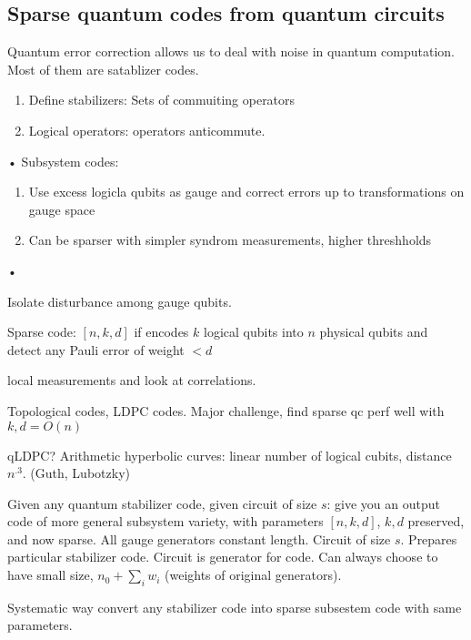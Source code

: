 \subsection{Sparse quantum codes from quantum circuits}

Quantum error correction allows us to deal with noise in quantum computation. Most of them are satablizer codes. 
\begin{enumerate}
\item
Define stabilizers: Sets of commuiting operators
\item
Logical operators: operators anticommute.
\end{enumerate}•
Subsystem codes:
\begin{enumerate}
\item
Use excess logicla qubits as gauge and correct errors up to transformations on gauge space
\item Can be sparser with simpler syndrom measurements, higher threshholds
\end{enumerate}•

Isolate disturbance among gauge qubits. %

Sparse code: $[n,k,d]$ if encodes $k$ logical qubits into $n$ physical qubits and detect any Pauli error of weight $<d$

 local measurements and look at correlations.

Topological codes, LDPC codes. Major challenge, find sparse qc perf well with $k,d=O(n)$

qLDPC? Arithmetic hyperbolic curves: linear number of logical cubits, distance $n^{.3}$. (Guth, Lubotzky) 

Given any quantum stabilizer code, given circuit of size $s$: give you an output code of more general subsystem variety, with parameters $[n,k,d]$, $k,d$ preserved, and now sparse. All gauge generators constant length. Circuit of size $s$. Prepares particular stabilizer code. Circuit is generator for code. Can always choose to have small size, $n_0+\sum_i w_i$ (weights of original generators).

Systematic way convert any stabilizer code into sparse subsestem code with same parameters.

